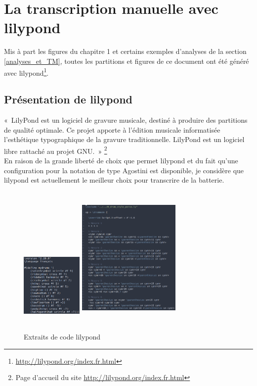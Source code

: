 \section{La transcription manuelle avec lilypond}
\label{tm}
Mis à part les figures du chapitre 1 et certains exemples d’analyses de la
section \ref{analyses_et_TM}, toutes les partitions et figures de ce document
ont été généré avec lilypond\footnote{\url{http://lilypond.org/index.fr.html}}.\\

\subsection*{Présentation de lilypond}
«~LilyPond est un logiciel de gravure musicale, destiné à produire des
partitions de qualité optimale. Ce projet apporte à l’édition musicale
informatisée l’esthétique typographique de la gravure traditionnelle. LilyPond
est un logiciel libre rattaché au projet GNU.~» \footnote{Page d’accueil du site \url{http://lilypond.org/index.fr.html}}\\

En raison de la grande liberté de choix que permet lilypond et du fait qu’une
configuration pour la notation de type Agostini est disponible, je considère
que lilypond est actuellement le meilleur choix pour transcrire de la batterie.\\

\begin{figure}[h]
    \centering
    \includegraphics[height=40mm, width=30mm]{
    z_images/3_methodes/transcription_manuelle/drum_perso_1}
    \includegraphics[height=70mm, width=50mm]{
    z_images/3_methodes/transcription_manuelle/extrait_code.png}
    \caption{Extraits de code lilypond}
    \label{extrait_code}
\end{figure}

